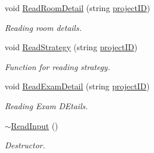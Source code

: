 \begin{DoxyCompactItemize}
void \hyperlink{classReadInput_a7a95590528e5e82277f75285e034eddd}{\-Read\-Room\-Detail} (string \hyperlink{classReadInput_a3ad470a25b3e0a29466bf4ff1f7d8e81}{project\-I\-D})
\begin{DoxyCompactList}\small\item\em \-Reading room details. \end{DoxyCompactList}\item 
void \hyperlink{classReadInput_a771826aa24574ac60472560c2c764755}{\-Read\-Strategy} (string \hyperlink{classReadInput_a3ad470a25b3e0a29466bf4ff1f7d8e81}{project\-I\-D})
\begin{DoxyCompactList}\small\item\em \-Function for reading strategy. \end{DoxyCompactList}\item 
void \hyperlink{classReadInput_a6e0815acdfaf61b7637a9c9e1c3621d1}{\-Read\-Exam\-Detail} (string \hyperlink{classReadInput_a3ad470a25b3e0a29466bf4ff1f7d8e81}{project\-I\-D})
\begin{DoxyCompactList}\small\item\em \-Reading \-Exam \-D\-Etails. \end{DoxyCompactList}\item 
\hyperlink{classReadInput_aec19e94e448ed46207c55412a61728fa}{$\sim$\-Read\-Input} ()
\begin{DoxyCompactList}\small\item\em \-Destructor. \end{DoxyCompactList}\end{DoxyCompactItemize}
